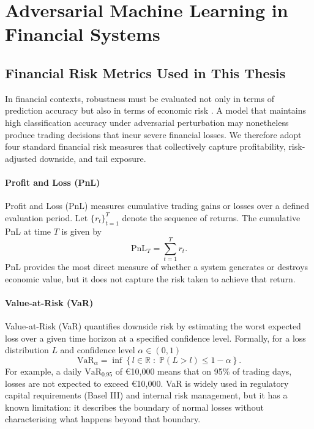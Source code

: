 \section{Adversarial Machine Learning in Financial Systems} \label{sec:adv-ml}

\subsection{Financial Risk Metrics Used in This Thesis} \label{sec:perf-metrics-bg}

In financial contexts, robustness must be evaluated not only in terms of prediction accuracy but also in terms of economic risk \cite{baviskar2025robust}. A model that maintains high classification accuracy under adversarial perturbation may nonetheless produce trading decisions that incur severe financial losses. We therefore adopt four standard financial risk measures \cite{hull2023risk} that collectively capture profitability, risk-adjusted downside, and tail exposure.

\paragraph{Profit and Loss (PnL)}
Profit and Loss (PnL) measures cumulative trading gains or losses over a defined evaluation period. Let $\{r_t\}_{t=1}^{T}$ denote the sequence of returns. The cumulative PnL at time $T$ is given by
\begin{equation}
\mathrm{PnL}_T = \sum_{t=1}^{T} r_t.
\end{equation}
PnL provides the most direct measure of whether a system generates or destroys economic value, but it does not capture the risk taken to achieve that return.

\paragraph{Value-at-Risk (VaR)}
Value-at-Risk (VaR) quantifies downside risk by estimating the worst expected loss over a given time horizon at a specified confidence level. Formally, for a loss distribution $L$ and confidence level $\alpha \in (0,1)$
\begin{equation}
\mathrm{VaR}_\alpha = \inf \left\{ l \in \mathbb{R} \;:\; \mathbb{P}(L > l) \leq 1 - \alpha \right\}.
\end{equation}
For example, a daily $\mathrm{VaR}_{0.95}$ of €10{,}000 means that on 95\% of trading days, losses are not expected to exceed €10{,}000. VaR is widely used in regulatory capital requirements (Basel III) and internal risk management, but it has a known limitation: it describes the boundary of normal losses without characterising what happens beyond that boundary.

